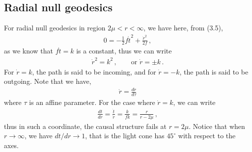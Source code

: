 \documentclass[11pt, onesided]{book}
\theoremstyle{break}
\theoremstyle{break}
\begin{document}
\subsection{Radial null geodesics}
For radial null geodesics in region $2\mu <r< \infty$, we have here, from (3.5),
\begin{align*}
0 = -\frac{1}{2}f\dot{t}^2 + \frac{\dot{r}^2}{2f}\,,
\end{align*}
as we know that $f\dot{t} = k$ is a constant, thus we can write
\begin{align*}
\dot{r}^2 = k^2\,,\qquad \text{or }\dot{r} =\pm k\,.
\end{align*}
For $\dot{r} = k$, the path is said to be incoming, and for $\dot{r} = -k$, the path is said to be outgoing. Note that we have,
\begin{align*}
\dot{r} = \frac{dr}{d\tau}
\end{align*}
where $\tau$ is an affine parameter. For the case where $\dot{r} = k$, we can write
\begin{align*}
\frac{dt}{dr} = \frac{\dot{t}}{\dot{r}} = \frac{k}{fk} = \frac{r}{r-2\mu }\,,
\end{align*}
thus in such a coordinate, the causal structure fails at $r = 2\mu $. Notice that when $r \to \infty$, we have $dt/dr \to 1$, that is the light cone has $45^\circ$ with respect to the axes. \\
\end{document}
